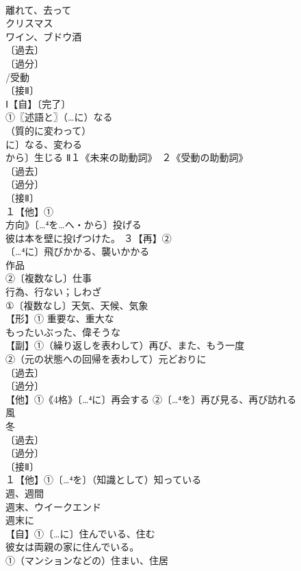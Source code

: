 \documentclass[8pt]{extreport}
\begin{document}
\begin{CJK}{UTF8}{min}
\\	離れて、去って
\\	クリスマス 
\\	ワイン、ブドウ酒 
\\	〔過去〕
\\	〔過分〕
\\	/受動 
\\	〔接Ⅱ〕
\\	Ⅰ【自】〔完了〕
\\	①〖述語と〗（…に）なる
\\	（質的に変わって）
\\	に〕なる、変わる 
\\	から〕生じる Ⅱ１《未来の助動詞》　２《受動の助動詞》
\\	〔過去〕
\\	〔過分〕
\\	〔接Ⅱ〕
\\	１【他】①
\\	方向》〔…⁴を…へ・から〕投げる
\\	彼は本を壁に投げつけた。 ３【再】②
\\	〔…⁴に〕飛びかかる、襲いかかる
\\	作品
\\	②〔複数なし〕仕事 
\\	行為、行ない；しわざ
\\	①〔複数なし〕天気、天候、気象
\\	【形】① 重要な、重大な
\\	もったいぶった、偉そうな 
\\	【副】①（繰り返しを表わして）再び、また、もう一度
\\	②（元の状態への回帰を表わして）元どおりに
\\	〔過去〕
\\	〔過分〕
\\	【他】①《4格》〔…⁴に〕再会する ②〔…⁴を〕再び見る、再び訪れる
\\	風
\\	冬 
\\	〔過去〕
\\	〔過分〕
\\	〔接Ⅱ〕
\\	１【他】①〔…⁴を〕（知識として）知っている
\\	週、週間
\\	週末、ウイークエンド
\\	週末に
\\	【自】①〔…に〕住んでいる、住む
\\	彼女は両親の家に住んでいる。 
\\	①（マンションなどの）住まい、住居

\end{CJK}
\end{document}
